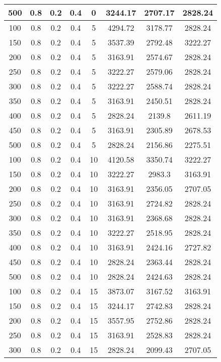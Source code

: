 \documentclass[a4paper, 12pt]{extreport}
\begin{document}
\begin{itemize}
\begin{longtable}{|c|c|c|c|c|c|c|c|}
			500 & 0.8 & 0.2 & 0.4 & 0 & 3244.17 & 2707.17 & 2828.24 \\\hline
			100 & 0.8 & 0.2 & 0.4 & 5 & 4294.72 & 3178.77 & 2828.24 \\\hline
			150 & 0.8 & 0.2 & 0.4 & 5 & 3537.39 & 2792.48 & 3222.27 \\\hline
			200 & 0.8 & 0.2 & 0.4 & 5 & 3163.91 & 2574.67 & 2828.24 \\\hline
			250 & 0.8 & 0.2 & 0.4 & 5 & 3222.27 & 2579.06 & 2828.24 \\\hline
			300 & 0.8 & 0.2 & 0.4 & 5 & 3222.27 & 2588.74 & 2828.24 \\\hline
			350 & 0.8 & 0.2 & 0.4 & 5 & 3163.91 & 2450.51 & 2828.24 \\\hline
			400 & 0.8 & 0.2 & 0.4 & 5 & 2828.24 & 2139.8 & 2611.19 \\\hline
			450 & 0.8 & 0.2 & 0.4 & 5 & 3163.91 & 2305.89 & 2678.53 \\\hline
			500 & 0.8 & 0.2 & 0.4 & 5 & 2828.24 & 2156.86 & 2275.51 \\\hline
			100 & 0.8 & 0.2 & 0.4 & 10 & 4120.58 & 3350.74 & 3222.27 \\\hline
			150 & 0.8 & 0.2 & 0.4 & 10 & 3222.27 & 2983.3 & 3163.91 \\\hline
			200 & 0.8 & 0.2 & 0.4 & 10 & 3163.91 & 2356.05 & 2707.05 \\\hline
			250 & 0.8 & 0.2 & 0.4 & 10 & 3163.91 & 2724.82 & 2828.24 \\\hline
			300 & 0.8 & 0.2 & 0.4 & 10 & 3163.91 & 2368.68 & 2828.24 \\\hline
			350 & 0.8 & 0.2 & 0.4 & 10 & 3222.27 & 2518.95 & 2828.24 \\\hline
			400 & 0.8 & 0.2 & 0.4 & 10 & 3163.91 & 2424.16 & 2727.82 \\\hline
			450 & 0.8 & 0.2 & 0.4 & 10 & 2828.24 & 2363.44 & 2828.24 \\\hline
			500 & 0.8 & 0.2 & 0.4 & 10 & 2828.24 & 2424.63 & 2828.24 \\\hline
			100 & 0.8 & 0.2 & 0.4 & 15 & 3873.07 & 3167.52 & 3163.91 \\\hline
			150 & 0.8 & 0.2 & 0.4 & 15 & 3244.17 & 2742.83 & 2828.24 \\\hline
			200 & 0.8 & 0.2 & 0.4 & 15 & 3557.95 & 2752.86 & 2828.24 \\\hline
			250 & 0.8 & 0.2 & 0.4 & 15 & 3163.91 & 2528.83 & 2828.24 \\\hline
			300 & 0.8 & 0.2 & 0.4 & 15 & 2828.24 & 2099.43 & 2707.05 \\\hline

\end{longtable}
\end{itemize}
\end{document}
